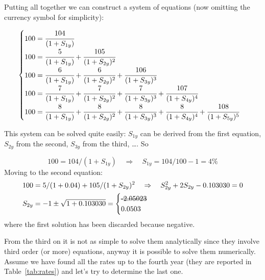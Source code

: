 Putting all together we can construct a system of equations (now omitting the currency symbol for simplicity):

\begin{equation}
\begin{cases}
100 = \cfrac{104}{(1 + S_{1y})} \\
100 = \cfrac{5}{(1 + S_{1y})} + \cfrac{105}{(1 + S_{2y})^{2}} \\
100 = \cfrac{6} {(1 + S_{1y})} + \cfrac{6}{(1 + S_{2y})^{2}} + \cfrac{106} {(1 + S_{3y})^{3}} \\
100 = \cfrac{7} {(1 + S_{1y})} + \cfrac{7} {(1 + S_{2y})^{2}} + \cfrac{7} {(1 + S_{3y})^{3}} + \cfrac{107} {(1 + S_{4y})^{4}} \\
100 = \cfrac{8} {(1 + S_{1y})} + \cfrac{8} {(1 + S_{2y})^{2}}+ \cfrac{8} {(1 + S_{3y})^{3}} + \cfrac{8} {(1 + S_{4y})^{4}} + \cfrac{108} {(1 + S_{5y})^{5}}
\end{cases}
\label{eq:fifth_year_rate}
\end{equation}

This system can be solved quite easily: $S_{1y}$ can be derived from the first equation, $S_{2y}$ from the second, $S_{3y}$ from the third, \ldots. So

\begin{equation}
100 = 104 / (1 + S_{1y})\quad\Rightarrow\quad S_{1y} = 104/100 - 1 = 4\%
\end{equation}
Moving to the second equation:
\begin{equation}
\begin{split}
& 100 = 5 / (1 + 0.04) + 105 / (1 + S_{2y})^{2}\quad\Rightarrow\quad S_{2y}^2  + 2 S_{2y}  - 0.103030 = 0 \\
& S_{2y} = - 1 \pm \sqrt{1 + 0.103030} = \begin{cases}\text{\sout{-2.05023}} \\ 0.0503\end{cases}
\end{split}
\end{equation}
where the first solution has been discarded because negative.

From the third on it is not as simple to solve them analytically since they involve third order (or more) equations, anyway it is possible to solve them numerically.
Assume we have found all the rates up to the fourth year (they are reported in Table~\ref{tab:rates}) and let's try to determine the last one.

